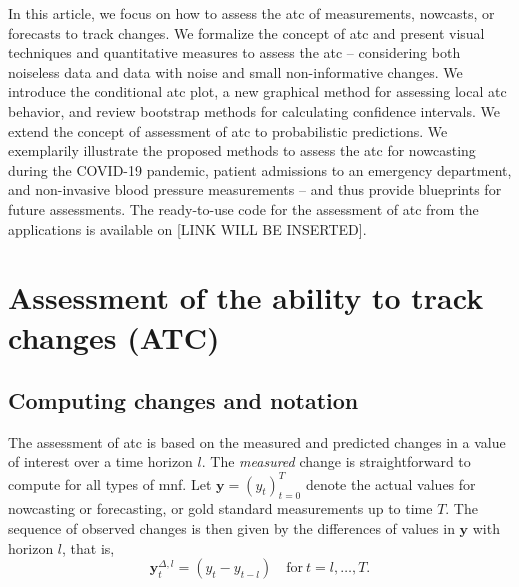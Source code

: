 \documentclass[pdflatex]{sn-jnl}
\theoremstyle{plain}%
\theoremstyle{definition}
\newcommand{\diffylt}{\mathbf{y}^{\Delta,l}_t}
\begin{document}
In this article, we focus on how to assess the \ac{atc} of measurements, nowcasts, or forecasts to track changes. We formalize the concept of \ac{atc} and present visual techniques and quantitative measures to assess the \ac{atc} – considering both noiseless data and data with noise and small non-informative changes.
We introduce the conditional \ac{atc} plot, a new graphical method for assessing local \ac{atc} behavior, and review bootstrap methods for calculating confidence intervals.
We extend the concept of assessment of \ac{atc} to probabilistic predictions.
We exemplarily illustrate the proposed methods to assess the \ac{atc} for nowcasting during the COVID-19 pandemic, patient admissions to an emergency department, and non-invasive blood pressure measurements – and thus provide blueprints for future assessments.
The ready-to-use code for the assessment of \ac{atc} from the applications is available on [LINK WILL BE INSERTED].


\section{Assessment of the ability to track changes (ATC)}\label{sec:aatc}

\subsection{Computing changes and notation}\label{subsec:notation}

The assessment of \ac{atc} is based on the measured and predicted changes in a value of interest over a time horizon $l$.
The \textit{measured} change is straightforward to compute for all types of \ac{mnf}.
Let $\mathbf{y} = (y_t)_{t=0}^T$ denote the actual values for nowcasting or forecasting, or gold standard measurements up to time $T$.
The sequence of observed changes is then given by the differences of values in $\mathbf{y}$ with horizon $l$, that is,
\begin{equation}\label{eq:diffy}
    \diffylt = (y_{t} - y_{t-l}) \quad \text{for}\ t = l, \dots, T.
\end{equation}
\end{document}
